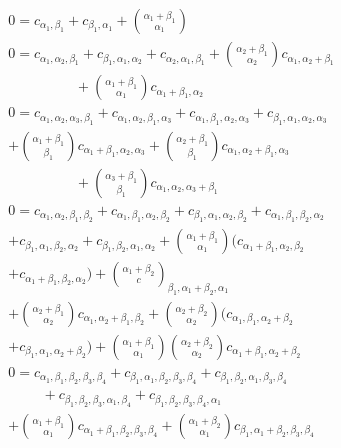 \documentclass[b5paper,draft,openbib,12pt]{memoir}
\begin{document}
\begin{align*}
&0 =c_{\alpha_1,\beta_1} + c_{\beta_1,\alpha_1}+ \binom{ \alpha_1 + \beta_1}{ \alpha_1} \\
&0 = c_{\alpha_1,\alpha_2,\beta_1} + c_{\beta_1,\alpha_1,\alpha_2} + c_{\alpha_2,\alpha_1,\beta_1} + 
\binom{\alpha_2 + \beta_1}{ \alpha_2} c_{\alpha_1,\alpha_2+\beta_1} \\
&\hspace{2cm}  +\binom{\alpha_1+\beta_1}{\alpha_1} c_{\alpha_1+\beta_1,\alpha_2}\\
&0= c_{\alpha_1,\alpha_2,\alpha_3,\beta_1} + c_{\alpha_1,\alpha_2,\beta_1,\alpha_3} 
+ c_{\alpha_1,\beta_1,\alpha_2,\alpha_3} + c_{\beta_1,\alpha_1,\alpha_2,\alpha_3}\\
&+\binom{\alpha_1+\beta_1}{\beta_1} 
c_{\alpha_1+\beta_1,\alpha_2,\alpha_3} 
+ \binom{\alpha_2+\beta_1}{\beta_1} c_{\alpha_1,\alpha_2+\beta_1,\alpha_3}\\
&\hspace{2cm} + \binom{\alpha_3+\beta_1}{\beta_1} c_{\alpha_1,\alpha_2,\alpha_3+\beta_1}\\
&0= c_{\alpha_1,\alpha_2,\beta_1,\beta_2} +c_{\alpha_1,\beta_1,\alpha_2,\beta_2} +
c_{\beta_1,\alpha_1,\alpha_2,\beta_2} +c_{\alpha_1,\beta_1,\beta_2,\alpha_2} \\
&+c_{\beta_1,\alpha_1,\beta_2,\alpha_2} +c_{\beta_1,\beta_2,\alpha_1,\alpha_2} 
+\binom{\alpha_1+\beta_1}{\alpha_1} (c_{\alpha_1+\beta_1,\alpha_2,\beta_2} \\
&+ c_{\alpha_1+\beta_1,\beta_2,\alpha_2})  
+\binom{\alpha_1+\beta_2}c_{\beta_1,\alpha_1+\beta_2,\alpha_1} \\
&+\binom{\alpha_2+\beta_1}{\alpha_2} c_{\alpha_1,\alpha_2+\beta_1,\beta_2}
+ \binom{\alpha_2+\beta_2}{\alpha_2} (c_{\alpha_1,\beta_1,\alpha_2+\beta_2}\\
&+ c_{\beta_1,\alpha_1,\alpha_2+\beta_2})
+ \binom{\alpha_1+\beta_1}{\alpha_1} \binom{\alpha_2+\beta_2}{\alpha_2}
 c_{\alpha_1+\beta_1,\alpha_2+\beta_2}\\
&0=c_{\alpha_1,\beta_1,\beta_2,\beta_3,\beta_4} 
+ c_{\beta_1,\alpha_1,\beta_2,\beta_3,\beta_4} 
+ c_{\beta_1,\beta_2,\alpha_1,\beta_3,\beta_4} \\
&\hspace{1cm}+ c_{\beta_1,\beta_2,\beta_3,\alpha_1,\beta_4} 
+ c_{\beta_1,\beta_2,\beta_3,\beta_4,\alpha_1} \\
&+\binom{\alpha_1+\beta_1}{\alpha_1} c_{\alpha_1+\beta_1,\beta_2,\beta_3,\beta_4}
+ \binom{\alpha_1+\beta_2}{\alpha_1} c_{\beta_1,\alpha_1+\beta_2,\beta_3,\beta_4}\\

\end{align*}
\end{document}
